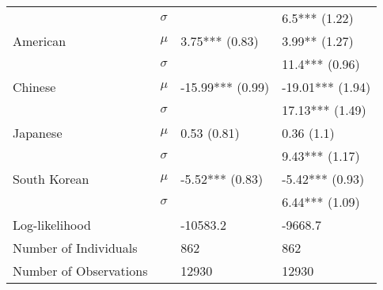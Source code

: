 \begin{tabular}{llll}
                       &  $\sigma$ &                                &                  6.5*** (1.22) \\
              American &     $\mu$ &                 3.75*** (0.83) &                  3.99** (1.27) \\
                       &  $\sigma$ &                                &                 11.4*** (0.96) \\
               Chinese &     $\mu$ &               -15.99*** (0.99) &               -19.01*** (1.94) \\
                       &  $\sigma$ &                                &                17.13*** (1.49) \\
              Japanese &     $\mu$ &                    0.53 (0.81) &                     0.36 (1.1) \\
                       &  $\sigma$ &                                &                 9.43*** (1.17) \\
          South Korean &     $\mu$ &                -5.52*** (0.83) &                -5.42*** (0.93) \\
                       &  $\sigma$ &                                &                 6.44*** (1.09) \\
 \hline Log-likelihood &           &                       -10583.2 &                        -9668.7 \\
 Number of Individuals &           &                            862 &                            862 \\
Number of Observations &           &                          12930 &                          12930 \\
\bottomrule
\end{tabular}
